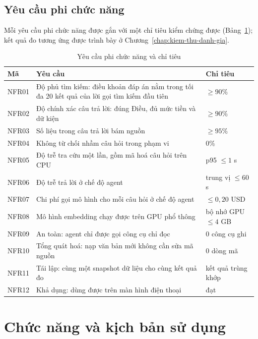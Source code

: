 \subsection{Yêu cầu phi chức năng}

Mỗi yêu cầu phi chức năng được gắn với một chỉ tiêu kiểm chứng được (Bảng~\ref{tab:yc-phichucnang}); kết quả đo tương ứng được trình bày ở Chương~\ref{chap:kiem-thu-danh-gia}.

\begin{table}[H]
\centering
\caption{Yêu cầu phi chức năng và chỉ tiêu}
\label{tab:yc-phichucnang}
\footnotesize
\begin{tabularx}{\textwidth}{@{}l X l@{}}
\toprule
\textbf{Mã} & \textbf{Yêu cầu} & \textbf{Chỉ tiêu} \\
\midrule
NFR01 & Độ phủ tìm kiếm: điều khoản đáp án nằm trong tối đa 20 kết quả của lời gọi tìm kiếm đầu tiên & $\geq 90\%$ \\
NFR02 & Độ chính xác câu trả lời: đúng Điều, đủ mức tiền và dữ kiện & $\geq 90\%$ \\
NFR03 & Số liệu trong câu trả lời bám nguồn & $\geq 95\%$ \\
NFR04 & Không từ chối nhầm câu hỏi trong phạm vi & 0\% \\
NFR05 & Độ trễ tra cứu một lần, gồm mã hoá câu hỏi trên CPU & p95 $\leq 1$ s \\
NFR06 & Độ trễ trả lời ở chế độ agent & trung vị $\leq 60$ s \\
NFR07 & Chi phí gọi mô hình cho mỗi câu hỏi ở chế độ agent & $\leq 0{,}20$ USD \\
NFR08 & Mô hình embedding chạy được trên GPU phổ thông & bộ nhớ GPU $\leq 4$ GB \\
NFR09 & An toàn: agent chỉ được gọi công cụ chỉ đọc & 0 công cụ ghi \\
NFR10 & Tổng quát hoá: nạp văn bản mới không cần sửa mã nguồn & 0 dòng mã \\
NFR11 & Tái lập: cùng một snapshot dữ liệu cho cùng kết quả đo & kết quả trùng khớp \\
NFR12 & Khả dụng: dùng được trên màn hình điện thoại & đạt \\
\bottomrule
\end{tabularx}
\end{table}

\section{Chức năng và kịch bản sử dụng}
\label{sec:usecase}

